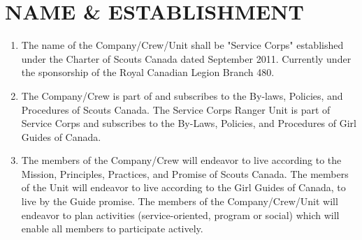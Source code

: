\documentclass{Service_Corps_Document}
\begin{document}
\def \Title {Constitution}
\def \Company {Service Corps}
\def \versionNumber {4.0}
\stdFooter
\begin{titlepage}
	\stdTitlePage
\end{titlepage}

\tableofcontents	
		
\newpage
\section{NAME \& ESTABLISHMENT}
\begin{enumerate}
	\item The name of the Company/Crew/Unit shall be "Service Corps" established under the Charter of Scouts Canada dated September 2011. Currently under the sponsorship of the Royal Canadian Legion Branch 480.
	\item The Company/Crew is part of and subscribes to the By-laws, Policies, and Procedures of Scouts Canada. The Service Corps Ranger Unit is part of Service Corps and subscribes to the By-Laws, Policies, and Procedures of Girl Guides of Canada.
	\item The members of the Company/Crew will endeavor to live according to the Mission, Principles, Practices, and Promise of Scouts Canada. The members of the Unit will endeavor to live according to the Girl Guides of Canada, to live by the Guide promise. The members of the Company/Crew/Unit will endeavor to plan activities (service-oriented, program or social) which will enable all members to participate actively.
\end{enumerate}	
\end{document}
